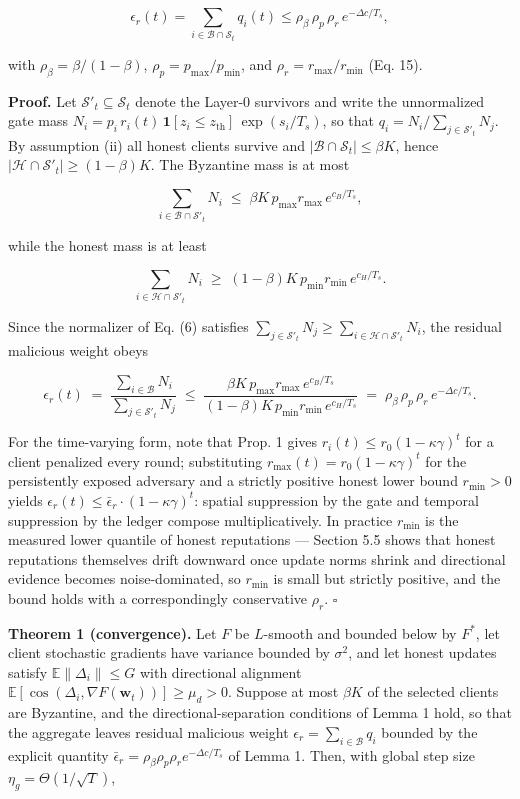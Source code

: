 \documentclass[cmc,article,submit,moreauthors,pdftex]{Definitions/tsp}
\begin{document}
\[
\epsilon_r(t) = \sum_{i \in \mathcal{B} \cap \mathcal{S}_t} q_i(t) \le \rho_\beta\, \rho_p\, \rho_r\, e^{-\Delta c/T_s},
\]

with $\rho_\beta = \beta/(1-\beta)$, $\rho_p = p_{\max}/p_{\min}$, and $\rho_r = r_{\max}/r_{\min}$ (Eq. 15).

\textbf{Proof.} Let $\mathcal{S}'_t \subseteq \mathcal{S}_t$ denote the Layer-0 survivors and write the unnormalized gate mass $N_i = p_i\, r_i(t)\, \mathbf{1}[z_i \le z_{\mathrm{th}}]\, \exp(s_i/T_s)$, so that $q_i = N_i / \sum_{j \in \mathcal{S}'_t} N_j$. By assumption (ii) all honest clients survive and $|\mathcal{B} \cap \mathcal{S}_t| \le \beta K$, hence $|\mathcal{H} \cap \mathcal{S}'_t| \ge (1-\beta)K$. The Byzantine mass is at most

\[
\sum_{i \in \mathcal{B} \cap \mathcal{S}'_t} N_i \;\le\; \beta K\, p_{\max} r_{\max}\, e^{c_B/T_s},
\]

while the honest mass is at least

\[
\sum_{i \in \mathcal{H} \cap \mathcal{S}'_t} N_i \;\ge\; (1-\beta)K\, p_{\min} r_{\min}\, e^{c_H/T_s}.
\]

Since the normalizer of Eq. (6) satisfies $\sum_{j \in \mathcal{S}'_t} N_j \ge \sum_{i \in \mathcal{H} \cap \mathcal{S}'_t} N_i$, the residual malicious weight obeys

\[
\epsilon_r(t) \;=\; \frac{\sum_{i \in \mathcal{B}} N_i}{\sum_{j \in \mathcal{S}'_t} N_j} \;\le\; \frac{\beta K\, p_{\max} r_{\max}\, e^{c_B/T_s}}{(1-\beta)K\, p_{\min} r_{\min}\, e^{c_H/T_s}} \;=\; \rho_\beta\, \rho_p\, \rho_r\, e^{-\Delta c/T_s}.
\]

For the time-varying form, note that Prop. 1 gives $r_i(t) \le r_0(1-\kappa\gamma)^t$ for a client penalized every round; substituting $r_{\max}(t) = r_0(1-\kappa\gamma)^t$ for the persistently exposed adversary and a strictly positive honest lower bound $r_{\min} > 0$ yields $\epsilon_r(t) \le \bar\epsilon_r \cdot (1-\kappa\gamma)^t$: spatial suppression by the gate and temporal suppression by the ledger compose multiplicatively. In practice $r_{\min}$ is the measured lower quantile of honest reputations --- Section 5.5 shows that honest reputations themselves drift downward once update norms shrink and directional evidence becomes noise-dominated, so $r_{\min}$ is small but strictly positive, and the bound holds with a correspondingly conservative $\rho_r$. $\square$

\textbf{Theorem 1 (convergence).} Let $F$ be $L$-smooth and bounded below by $F^*$, let client stochastic gradients have variance bounded by $\sigma^2$, and let honest updates satisfy $\mathbb{E}\|\Delta_i\| \le G$ with directional alignment $\mathbb{E}[\cos(\Delta_i, \nabla F(\mathbf{w}_t))] \ge \mu_d > 0$. Suppose at most $\beta K$ of the selected clients are Byzantine, and the directional-separation conditions of Lemma 1 hold, so that the aggregate leaves residual malicious weight $\epsilon_r = \sum_{i \in \mathcal{B}} q_i$ bounded by the explicit quantity $\bar\epsilon_r = \rho_\beta \rho_p \rho_r e^{-\Delta c/T_s}$ of Lemma 1. Then, with global step size $\eta_g = \Theta(1/\sqrt{T})$,
\end{document}

